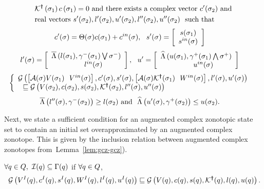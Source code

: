 \begin{lemma}
\begin{enumerate}
\begin{align}
\begin{split}
& \mathcal{K}^{\bm{\dagger}}\left(\sigma_{1}\right)c\left(\sigma_{1}\right) =
  0~\text{and there exists a complex
  vector}~c^\prime(\sigma_{2})~\text{and}\\
& \text{real
    vectors}~s^\prime(\sigma_{2}),l^\prime(\sigma_{2}),u^\prime(\sigma_{2}),l^{\prime\prime}(\sigma_{2}),u^{\prime\prime}(\sigma_{2})~~\text{such
  that}
\end{split}
\end{align}
\vspace{-1.5em}
\begin{align}
& c^\prime(\sigma) = \Theta(\sigma)c(\sigma_{1})+c^{in}(\sigma),~~s^\prime(\sigma) =
  \left[\begin{array}{c}{s(\sigma_{1})}\\{s^{in}(\sigma)} \end{array}\right]
\end{align}
\vspace{-1.5em}
\begin{align}
& l^\prime(\sigma) =
  \left[\begin{array}{c}{\overline{\Lambda}\left(l(\sigma_{1}),\gamma^-(\sigma_{1})\bigvee\sigma^-\right)}\\{~~~~~~~~~l^{in}(\sigma)~~~} \end{array}\right],~~u^\prime =
  \left[\begin{array}{c}{\widehat{\Lambda}\left(u(\sigma_{1}),\gamma^+(\sigma_{1})\bigwedge\sigma^+\right)}\\{~~~~~~~~~u^{in}(\sigma)~~~} \end{array}\right]
\end{align}
\vspace{-1.5em}
\begin{align}
& \left\{\begin{array}{l}{\mathcal{G}\left(\left[\mathcal{A}(\sigma)V(\sigma_{1})~~V^{in}(\sigma)\right],c^\prime(\sigma),s^\prime(\sigma),\left[\mathcal{A}(\sigma)\mathcal{K}^{\bm{\dagger}}(\sigma_{1})~~W^{in}(\sigma)\right],l^\prime(\sigma),u^\prime(\sigma)\right)}\\{~~\sqsubseteq
   \mathcal{G}\left(V(\sigma_{2}),c(\sigma_{2}),s(\sigma_{2}),\mathcal{K}^{\bm{\dagger}}(\sigma_{2}),l^{\prime\prime}(\sigma),u^{\prime\prime}(\sigma)\right)} \end{array}\right.
\end{align}
\vspace{-1.5em}
\begin{align}
& \overline{\Lambda}\left(l^{\prime\prime}(\sigma),\gamma^-(\sigma_{2})\right)\geq l(\sigma_{2})~\text{and}~~
\widehat{\Lambda}\left(u^\prime(\sigma),\gamma^+(\sigma_{2})\right)\leq u(\sigma_{2}).
\end{align}
\vspace{-1.5em}
\end{enumerate}
\end{lemma}
%
Next, we state a sufficient condition for an augmented complex
zonotopic state set to contain an initial set overapproximated by an
augmented complex zonotope.  This is given by the inclusion relation
between augmented complex zonotopes from~Lemma~\ref{lem:gcz-gcz}).
\begin{lemma}
 $\forall q\in Q,~\mathcal{I}(q)\subseteq
  \Gamma(q)$ if $\forall q\in Q$,
\begin{align}~\label{eqn:initcont}
\mathcal{G}\left(V^I(q),c^I(q),s^I(q),W^I(q),l^I(q),u^I(q)\right)\sqsubseteq\mathcal{G}\left(V(q),c(q),s(q),\mathcal{K}^{\bm{\dagger}}(q),l(q),u(q)\right).
\end{align}
\end{lemma}
